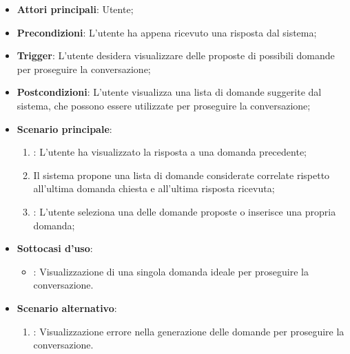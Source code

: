 \begin{itemize}
    \item \textbf{Attori principali}: Utente;
    \item \textbf{Precondizioni}: L'utente ha appena ricevuto una risposta dal sistema;
    \item \textbf{Trigger}: L'utente desidera visualizzare delle proposte di possibili domande per proseguire la conversazione;
    \item \textbf{Postcondizioni}: L'utente visualizza una lista di domande suggerite dal sistema, che possono essere utilizzate per proseguire la conversazione;
    \item \textbf{Scenario principale}:
    \begin{enumerate}
        \item {}: L'utente ha visualizzato la risposta a una domanda precedente;
        \item Il sistema propone una lista di domande considerate correlate rispetto all'ultima domanda chiesta
        e all'ultima risposta ricevuta;
        \item {}: L'utente seleziona una delle domande proposte o inserisce una propria domanda;
    \end{enumerate}
    \item \textbf{Sottocasi d'uso}:
    \begin{itemize}
        \item {}: Visualizzazione di una singola domanda ideale per proseguire la conversazione.
    \end{itemize}
    \item \textbf{Scenario alternativo}:
    \begin{enumerate}
        \item {}: Visualizzazione errore nella generazione delle domande per proseguire la conversazione.
    \end{enumerate}
\end{itemize}

\hypertarget{UC12.1}{}
